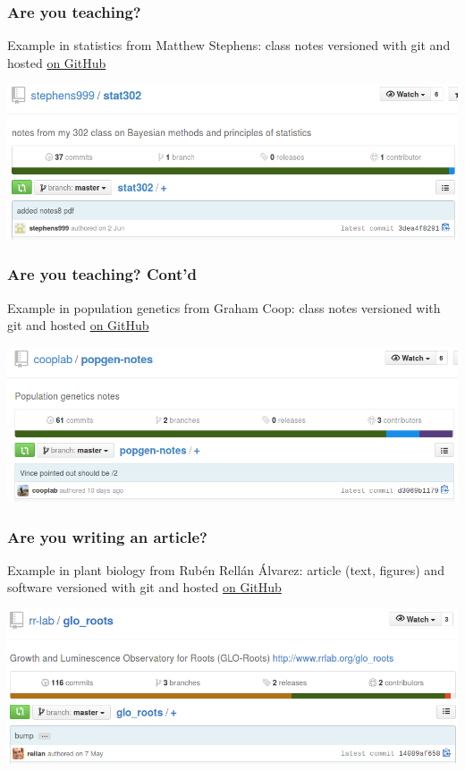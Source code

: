 \documentclass[c]{beamer} %
\begin{document}
\begin{frame}
  \frametitle{Are you teaching?}
  Example in \alert{statistics} from Matthew Stephens: class notes versioned with git and hosted \href{https://github.com/stephens999/stat302}{on GitHub}
  
  \bigskip
  
  \begin{center}
    \includegraphics[width=\textwidth,height=\textheight,keepaspectratio=true]{mstephens_stat302}%
  \end{center}
\end{frame}  

\begin{frame}
  \frametitle{Are you teaching? Cont'd}
  Example in \alert{population genetics} from Graham Coop: class notes versioned with git and hosted \href{https://github.com/cooplab/popgen-notes}{on GitHub}
  
  \bigskip
  
  \begin{center}
    \includegraphics[width=\textwidth,height=\textheight,keepaspectratio=true]{cooplab_popgen}%
  \end{center}
\end{frame}  

\begin{frame}
  \frametitle{Are you writing an article?}
  Example in \alert{plant biology} from Rubén Rellán Álvarez: article (text, figures) and software versioned with git and hosted \href{https://github.com/rr-lab/glo_roots}{on GitHub}
  
  \bigskip
  
  \begin{center}
    \includegraphics[width=\textwidth,height=\textheight,keepaspectratio=true]{rrlab_roots}%
  \end{center}
\end{frame}
\end{document}
